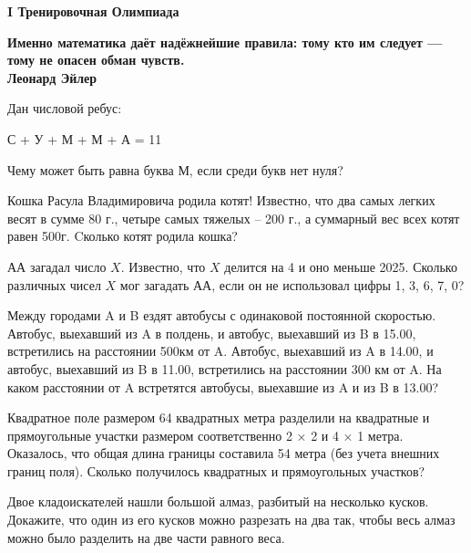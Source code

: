 \centerline{\bf \Huge I Тренировочная Олимпиада}

\begin{flushright}
        \scriptsize{\textbf{Именно математика даёт надёжнейшие правила: тому кто им следует — тому не опасен обман чувств.\\
         Леонард Эйлер}}
        
\end{flushright}

 Дан числовой ребус:

С + У + М + М + А = 11

Чему может быть равна буква М, если среди букв нет нуля?

 Кошка Расула Владимировича родила котят! Известно, что два самых
легких весят в сумме 80 г., четыре самых тяжелых – 200 г., а
суммарный вес всех котят равен 500г. Cколько котят родила кошка?

 АА загадал число $X$. Известно, что $X$ делится на 4 и оно меньше 2025. Сколько различных чисел $X$ мог загадать АА, если он не использовал цифры 1, 3, 6, 7, 0?

 Между городами A и B ездят автобусы с одинаковой постоянной скоростью. Автобус,
выехавший из A в полдень, и автобус, выехавший из B в 15.00, встретились на расстоянии 500км от A. Автобус, выехавший из A в 14.00, и автобус, выехавший из B в 11.00, встретились на
расстоянии 300 км от A. На каком расстоянии от A встретятся автобусы, выехавшие из A и из B
в 13.00?

 Квадратное поле размером 64 квадратных метра разделили на квадратные и прямоугольные
участки размером соответственно 2 × 2 и 4 × 1 метра. Оказалось, что общая длина границы
составила 54 метра (без учета внешних границ поля). Сколько получилось квадратных и
прямоугольных участков?

 Двое кладоискателей нашли большой алмаз, разбитый на несколько кусков. Докажите, что один
из его кусков можно разрезать на два так, чтобы весь алмаз можно было разделить на две части
равного веса.